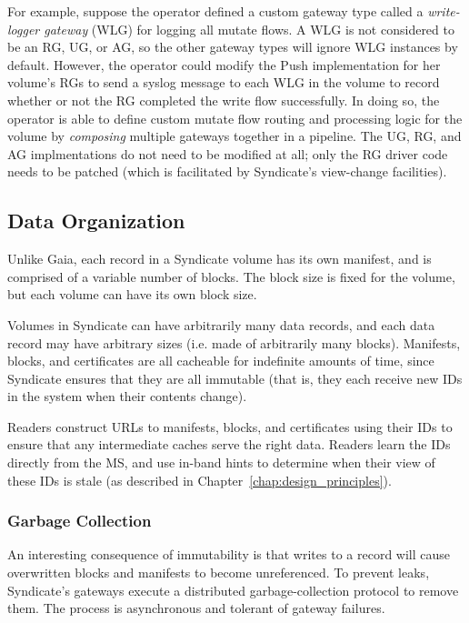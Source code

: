 For example, suppose the operator defined a custom gateway
type called a \emph{write-logger gateway} (WLG) for logging all mutate flows.
A WLG is not considered to be
an RG, UG, or AG, so the other gateway types will ignore WLG instances by
default.  However, the operator could modify the Push implementation for
her volume's RGs to send a syslog message to each WLG in the volume to record
whether or not the RG completed the write flow successfully.  In doing so, the
operator is able to define custom mutate flow routing and processing
logic for the volume by \emph{composing} multiple gateways together in a
pipeline.  The UG, RG, and AG implmentations do not need to be modified at all;
only the RG driver code needs to be patched (which is facilitated by Syndicate's
view-change facilities).

\subsection{Data Organization}

Unlike Gaia, each record in a Syndicate volume has its own manifest, and is
comprised of a variable number of blocks.  The block size is fixed for the
volume, but each volume can have its own block size.

Volumes in Syndicate can have arbitrarily many data records, and each data
record may have arbitrary sizes (i.e. made of arbitrarily many blocks).
Manifests, blocks, and certificates are all cacheable for
indefinite amounts of time, since Syndicate ensures that they are all immutable
(that is, they each receive new IDs in the system when their contents change).

Readers construct URLs to manifests, blocks, and certificates using their IDs to
ensure that any intermediate caches serve the right data.  Readers learn the IDs
directly from the MS, and use in-band hints to determine when their view of
these IDs is stale (as described in Chapter~\ref{chap:design_principles}).

\subsubsection{Garbage Collection}

An interesting consequence of immutability is that writes to a record will cause
overwritten blocks and manifests to become unreferenced.  To prevent leaks, Syndicate's gateways
execute a distributed garbage-collection protocol to remove them.  The process
is asynchronous and tolerant of gateway failures.

